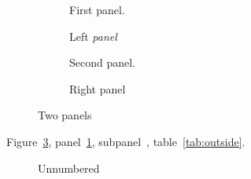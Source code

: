 \documentclass{article}
\begin{document}
\captionsetup{font=small}
\begin{figure}
\begin{subfigure}[b]{0.45\textwidth}
First panel.
\caption{Left \emph{panel}}\label{fig:left}
\end{subfigure}
\begin{subfigure}[b]{0.45\textwidth}
Second panel.
\caption{Right panel}\label{fig:right}
\end{subfigure}
\caption{Two panels}\label{fig:both}
\end{figure}
\label{tab:outside}
Figure~\ref{fig:both}, panel~\ref{fig:left}, subpanel~, table~\ref{tab:outside}.
\begin{figure}\captionsetup{labelsep=colon}\caption*{Unnumbered}\end{figure}
\end{document}

